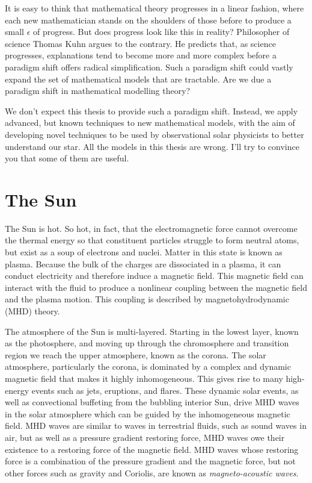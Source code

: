 \documentclass[12pt]{../style-files/ociamthesis}
\begin{document}
It is easy to think that mathematical theory progresses in a linear fashion, where each new mathematician stands on the shoulders of those before to produce a small $\epsilon$ of progress. But does progress look like this in reality? Philosopher of science Thomas Kuhn argues to the contrary. He predicts that, as science progresses, explanations tend to become more and more complex before a paradigm shift offers radical simplification. Such a paradigm shift could vastly expand the set of mathematical models that are tractable. Are we due a paradigm shift in mathematical modelling theory?

We don't expect this thesis to provide such a paradigm shift. Instead, we apply advanced, but known techniques to new mathematical models, with the aim of developing novel techniques to be used by observational solar physicists to better understand our star. All the models in this thesis are wrong. I'll try to convince you that some of them are useful.


\section{The Sun}
\label{sec: sun}

The Sun is hot. So hot, in fact, that the electromagnetic force cannot overcome the thermal energy so that constituent particles struggle to form neutral atoms, but exist as a soup of electrons and nuclei. Matter in this state is known as plasma. Because the bulk of the charges are dissociated in a plasma, it can conduct electricity and therefore induce a magnetic field. This magnetic field can interact with the fluid to produce a nonlinear coupling between the magnetic field and the plasma motion. This coupling is described by magnetohydrodynamic (MHD) theory.

The atmosphere of the Sun is multi-layered. Starting in the lowest layer, known as the photosphere, and moving up through the chromosphere and transition region we	reach the upper atmosphere, known as the corona. The solar atmosphere, particularly the corona, is dominated by a complex and dynamic magnetic field that makes it highly inhomogeneous. This gives rise to many high-energy events such as jets, eruptions, and flares. These dynamic solar events, as well as convectional buffeting from the bubbling interior Sun, drive MHD waves in the solar atmosphere which can be guided by the inhomogeneous magnetic field. MHD waves are similar to waves in terrestrial fluids, such as sound waves in air, but as well as a pressure gradient restoring force, MHD waves owe their existence to a restoring force of the magnetic field. MHD waves whose restoring force is a combination of the pressure gradient and the magnetic force, but not other forces such as gravity and Coriolis, are known as \textit{magneto-acoustic waves}.
\end{document}

